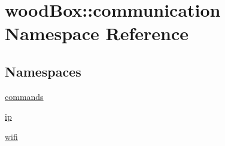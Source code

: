 \hypertarget{namespacewood_box_1_1communication}{}\section{wood\+Box\+:\+:communication Namespace Reference}
\label{namespacewood_box_1_1communication}
\subsection*{Namespaces}
\begin{DoxyCompactItemize}
\item 
 \mbox{\hyperlink{namespacewood_box_1_1communication_1_1commands}{commands}}
\item 
 \mbox{\hyperlink{namespacewood_box_1_1communication_1_1ip}{ip}}
\item 
 \mbox{\hyperlink{namespacewood_box_1_1communication_1_1wifi}{wifi}}
\end{DoxyCompactItemize}
